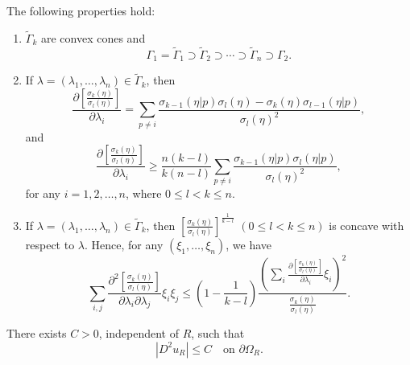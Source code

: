 \documentclass[10pt,a4paper]{amsart}
\begin{document}
	\begin{proposition}\label{prop}
		The following properties hold:
		\begin{enumerate}
			\item $\widetilde{\Gamma}_k$ are convex cones and
			\[
			\Gamma_1 = \widetilde{\Gamma}_1 \supset \widetilde{\Gamma}_2 \supset \cdots \supset \widetilde{\Gamma}_n \supset \Gamma_2.
			\]
			
			\item If $\lambda = (\lambda_1, \ldots, \lambda_n) \in \widetilde{\Gamma}_k$, then
			\[
			\frac{\partial \left[ \frac{\sigma_k(\eta)}{\sigma_l(\eta)} \right]}{\partial \lambda_i}
			= \sum_{p \neq i} \frac{\sigma_{k-1}(\eta|p)\sigma_l(\eta) - \sigma_k(\eta)\sigma_{l-1}(\eta|p)}{\sigma_l(\eta)^2},
			\]
			and
			\[
			\frac{\partial \left[ \frac{\sigma_k(\eta)}{\sigma_l(\eta)} \right]}{\partial \lambda_i}
			\geq \frac{n(k-l)}{k(n-l)} \sum_{p \neq i} \frac{\sigma_{k-1}(\eta|p)\sigma_l(\eta|p)}{\sigma_l(\eta)^2},
			\]
			for any $i = 1, 2, \ldots, n$, where $0 \leq l < k \leq n$.
			
			\item If $\lambda = (\lambda_1, \ldots, \lambda_n) \in \widetilde{\Gamma}_k$, then $\left[ \frac{\sigma_k(\eta)}{\sigma_l(\eta)} \right]^{\frac{1}{k-l}}$ $(0 \leq l < k \leq n)$ is concave with respect to $\lambda$. Hence, for any $(\xi_1, \ldots, \xi_n)$, we have
			\[
			\sum_{i,j} \frac{\partial^2 \left[ \frac{\sigma_k(\eta)}{\sigma_l(\eta)} \right]}{\partial \lambda_i \partial \lambda_j} \xi_i \xi_j
			\leq
			\left(1 - \frac{1}{k-l}\right)
			\frac{
				\left(
				\sum_i \frac{\partial \left[ \frac{\sigma_k(\eta)}{\sigma_l(\eta)} \right]}{\partial \lambda_i} \xi_i
				\right)^2
			}{
				\frac{\sigma_k(\eta)}{\sigma_l(\eta)}
			}.
			\]
		\end{enumerate}
	\end{proposition}

	\begin{proposition}
		There exists $C > 0$, independent of $R$, such that
		\[
		|D^2 u_R| \le C \quad \text{on } \partial \Omega_R.
		\]
	\end{proposition}
\end{document}
